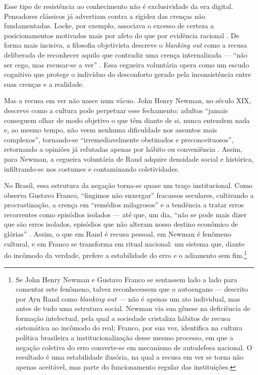 Esse tipo de resistência ao conhecimento não é exclusividade da era digital. Pensadores clássicos já advertiam contra a rigidez das crenças não fundamentadas. Locke, por exemplo, associava o excesso de certeza a posicionamentos motivados mais por afeto do que por evidência racional \cite{locke2014ensaio}. De forma mais incisiva, a filosofia objetivista descreve o \textit{blanking out} como a recusa deliberada de reconhecer aquilo que contradiz uma crença internalizada — ``não ser cego, mas recusar-se a ver'' \cite[p.~869]{rand2012revolta}. Essa cegueira voluntária opera como um escudo cognitivo que protege o indivíduo do desconforto gerado pela inconsistência entre suas crenças e a realidade.

Mas a recusa em ver não nasce num vácuo. John Henry Newman, no século XIX, descreve como a cultura pode perpetuar esse fechamento: adultos ``jamais conseguem olhar de modo objetivo o que têm diante de si, nunca entendem nada e, ao mesmo tempo, não veem nenhuma dificuldade nos assuntos mais complexos'', tornando-se ``irremediavelmente obstinados e preconceituosos'', retornando a opiniões já refutadas apenas por hábito ou conveniência \cite[p.~115-116]{newman2020ideia}. Assim, para Newman, a cegueira voluntária de Rand adquire densidade social e histórica, infiltrando-se nos costumes e contaminando coletividades.

No Brasil, essa estrutura da negação torna-se quase um traço institucional. Como observa Gustavo Franco, ``fingimos não enxergar'' fracassos seculares, cultivando a procrastinação, a crença em ``remédios milagrosos'' e a tendência a tratar erros recorrentes como episódios isolados — até que, um dia, ``não se pode mais dizer que são erros isolados, episódios que não alteram nosso destino econômico de glórias'' \cite[p.~38-39]{franco2021licoes}. Assim, o que em Rand é recusa pessoal, em Newman é fenômeno cultural, e em Franco se transforma em ritual nacional: um sistema que, diante do incômodo da verdade, prefere a estabilidade do erro e o adiamento sem fim.\footnote{Se John Henry Newman e Gustavo Franco se sentassem lado a lado para comentar este fenômeno, talvez reconhecessem que o autoengano — descrito por Ayn Rand como \textit{blanking out} — não é apenas um ato individual, mas antes de tudo uma estrutura social. Newman via sua gênese na deficiência de formação intelectual, pela qual a sociedade cristaliza hábitos de recusa sistemática ao incômodo do real; Franco, por sua vez, identifica na cultura política brasileira a institucionalização desse mesmo processo, em que a negação coletiva do erro converte-se em mecanismo de autodefesa nacional. O resultado é uma estabilidade ilusória, na qual a recusa em ver se torna não apenas aceitável, mas parte do funcionamento regular das instituições.}

